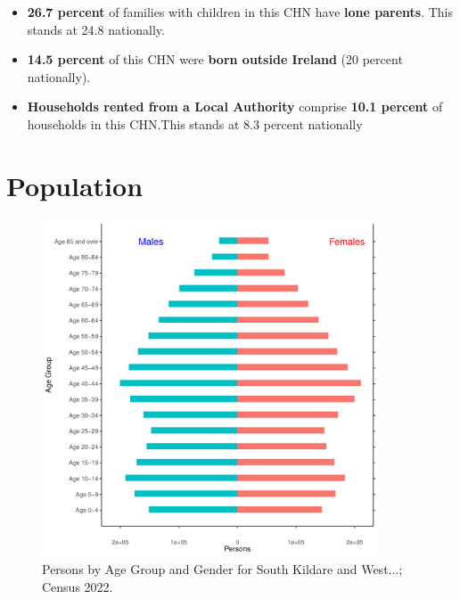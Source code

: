 \documentclass{article}
\begin{document}
\begin{itemize}
\item \textbf{26.7 percent} of families with children in this CHN have \textbf{lone parents}. This stands at 24.8 nationally.

\item \textbf{14.5 percent} of this CHN were \textbf{born outside Ireland} (20 percent nationally).

\item \textbf{Households rented from a Local Authority} comprise \textbf{10.1 percent} of households in this CHN.This stands at 8.3 percent nationally

\end{itemize}

\pagebreak

\section{Population} 
\label{sect:Pop}

\begin{figure}[h]
	\centering
	\includegraphics[width = 100mm]{../figures/PyramidPlot.pdf}
	\caption{Persons by Age Group and Gender for South Kildare and West...; Census 2022.}
	\label{fig:2ae19629-1a6a-13a3-e055-000000000001}
	\end{figure}
\end{document}

